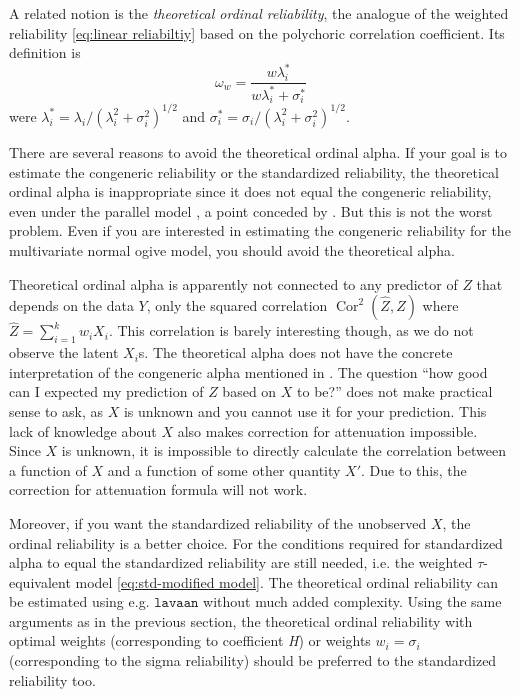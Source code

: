 \documentclass[twoside]{article}
\DeclareMathOperator{\Cor}{Cor}
\renewcommand{\sqrt}[1]{{(#1)^{1/2}}}
\begin{document}
A related notion is the \textit{theoretical ordinal reliability}, the
analogue of the weighted reliability \eqref{eq:linear reliabiltiy} based on the polychoric
correlation coefficient. Its definition is 
\begin{equation}
\omega_{w}=\frac{w\lambda_{i}^{*}}{w\lambda_{i}^{*}+\sigma_{i}^{*}}\label{eq:ordinal omega}
\end{equation}
were $\lambda_{i}^{*}=\lambda_{i}/\sqrt{\lambda_{i}^{2}+\sigma_{i}^{2}}$
and $\sigma_{i}^{*}=\sigma_{i}/\sqrt{\lambda_{i}^{2}+\sigma_{i}^{2}}$.

There are several reasons to avoid the theoretical ordinal alpha. If your
goal is to estimate the congeneric reliability or the standardized
reliability, the theoretical ordinal alpha is inappropriate since
it does not equal the congeneric reliability, even under the parallel
model \citep[p. 1062, "Misconception 2"]{Chalmers2018-fj}, a point
conceded by \citet{Zumbo2019-lm}. But this is not the worst problem.
Even if you are interested in estimating the congeneric reliability
for the multivariate normal ogive model, you should avoid the theoretical
alpha.

Theoretical ordinal alpha is apparently not connected to any predictor
of $Z$ that depends on the data $Y$, only the squared correlation $\Cor^{2}(\hat{Z},Z)$ where $\hat{Z}=\sum_{i=1}^k w_iX_i$. This correlation is barely interesting though, as we do not observe
the latent $X_{i}$s. The theoretical alpha does not have the concrete
interpretation of the congeneric alpha mentioned in . The question
``how good can I expected my prediction of $Z$ based on $X$ to
be?'' does not make practical sense to ask, as $X$ is unknown and you cannot use it for your prediction. This
lack of knowledge about $X$ also makes correction for attenuation
impossible. Since $X$ is unknown, it is impossible to directly calculate
the correlation between a function of $X$ and a function of some
other quantity $X'$. Due to this, the correction for attenuation formula
will not work. 

Moreover, if you want the standardized reliability of the unobserved
$X$, the ordinal reliability is a better choice. For the conditions
required for standardized alpha to equal the standardized reliability
are still needed, i.e. the weighted $\tau$-equivalent model \eqref{eq:std-modified model}. The
theoretical ordinal reliability can be estimated using e.g. $\mathtt{lavaan}$
without much added complexity. Using the same arguments as in the
previous section, the theoretical ordinal reliability with optimal
weights (corresponding to coefficient \textit{H}) or weights $w_{i}=\sigma_{i}$
(corresponding to the sigma reliability) should be preferred to the
standardized reliability too.
\end{document}
